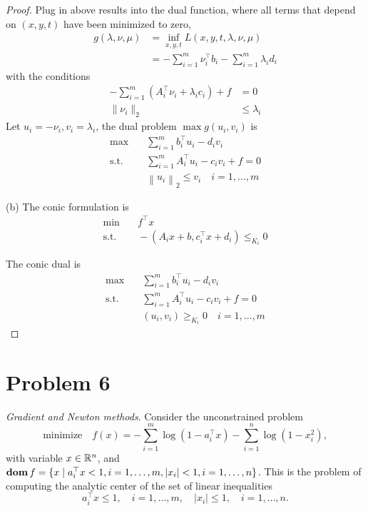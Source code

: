 \documentclass[11pt]{article}
\newcommand{\T}{^\top}          %
\begin{document}
\begin{proof}
Plug in above results into the dual function, where all terms that depend on $(x, y, t)$ have been minimized to zero, 
\begin{align*}
    g(\lambda, \nu, \mu) &= \inf_{x, y, t} L(x, y, t, \lambda, \nu, \mu) \\
    &= - \sum_{i=1}^m \nu_i^\top b_i - \sum_{i=1}^m \lambda_i d_i
\end{align*}
with the conditions
\begin{align*}
    - \sum_{i=1}^m \left( A_i^\top \nu_i + \lambda_i c_i \right) + f &= 0 \\
    \| \nu_i \|_2 &\leq \lambda_i
\end{align*}
Let $u_i = -\nu_i, v_i = \lambda_i$, the dual problem $\max g(u_i, v_i)$ is 
\begin{align*}
    \max \quad & \sum_{i=1}^m b_i^\top u_i - d_i v_i\\
    \text{s.t.} \quad & \sum_{i=1}^m A_i^\top u_i - c_i v_i + f = 0 \\
    & \left\| u_i \right\|_2 \leq v_i \quad i = 1, \ldots, m
\end{align*}

(b) 
The conic formulation is 
\begin{align*}
    \min &\quad f^\top x \\
    \text{s.t.} &\quad -(A_i x + b, c_i^\top x + d_i) \leq_{K_i} 0
\end{align*}

The conic dual is 
\begin{align*}
  \max \quad & \sum_{i=1}^m b_i^\top u_i - d_i v_i\\
  \text{s.t.} \quad & \sum_{i=1}^m A_i^\top u_i - c_i v_i + f = 0 \\
  & (u_i, v_i) \geq_{K_i} 0 \quad i = 1, \ldots, m
\end{align*}
\end{proof}


\clearpage
\section*{Problem 6}
\textit{Gradient and Newton methods}. Consider the unconstrained problem
\[
\text{minimize} \quad f(x) = -\sum_{i=1}^{m}\log(1 - a_i\T x) - \sum_{i=1}^{n} \log(1 - x^2_i),
\]
with variable $x\in{{\mathbb{R}}}^n$, and $\dom f=\{x \mid a_i\T x < 1, i = 1, \dots, m, |x_i| < 1, i = 1, \dots, n\}$.
This is the problem of computing the analytic center of the set of linear inequalities
\[
a_i\T x \leq 1, \quad i=1, \dots, m, \quad |x_i| \leq 1, \quad i = 1, \dots, n.
\]
\end{document}
